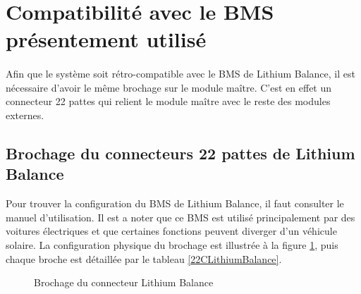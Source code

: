 \section{Compatibilité avec le BMS présentement utilisé}
	\paragraph*{}	
	Afin que le système soit rétro-compatible avec le BMS de Lithium Balance, il est nécessaire d'avoir le même brochage sur le module maître. C'est en effet un connecteur 22 pattes qui relient le module maître avec le reste des modules externes.

	\subsection{Brochage du connecteurs 22 pattes de Lithium Balance}
	
	Pour trouver la configuration du BMS de Lithium Balance, il faut consulter le manuel d'utilisation. Il est a noter que ce BMS est utilisé principalement par des voitures électriques et que certaines fonctions peuvent diverger d'un véhicule solaire. La configuration physique du brochage est illustrée à la figure \ref{fig:lithiumbalancepinout}, puis chaque broche est détaillée par le tableau \ref{22CLithiumBalance}.
	
	\begin{figure}[H]
		\centering
		\caption{Brochage du connecteur Lithium Balance}
		\label{fig:lithiumbalancepinout}
	\end{figure}
	
